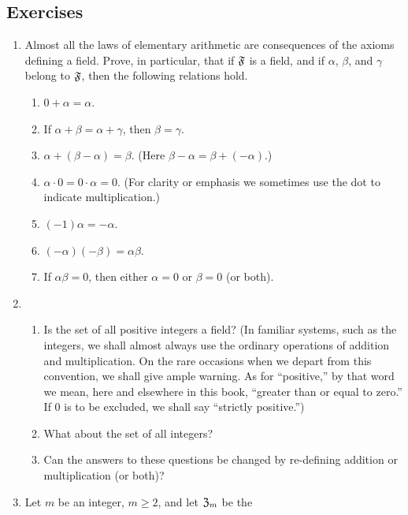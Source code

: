 {\small
\subsection*{Exercises}
\begin{enumerate}[wide]
    \item Almost all the laws of elementary arithmetic are consequences of the axioms defining a field. Prove, in particular, that if \(\mathfrak{F}\) is a field, and if \(\alpha\), \(\beta\), and \(\gamma\) belong to \(\mathfrak{F}\), then the following relations hold.
    \begin{enumerate}[label=(\alph*), wide, nosep]
        \item \(0 + \alpha = \alpha\).
        \item If \(\alpha + \beta = \alpha + \gamma\), then \(\beta = \gamma\).
        \item \(\alpha + (\beta - \alpha) = \beta\). (Here \(\beta - \alpha = \beta + (-\alpha)\).)
        \item \(\alpha \cdot 0 = 0 \cdot \alpha = 0\). (For clarity or emphasis we sometimes use the dot to indicate multiplication.)
        \item \((-1)\alpha = -\alpha\).
        \item \((-\alpha)(-\beta) = \alpha \beta\).
        \item If \(\alpha\beta = 0\), then either \(\alpha = 0\) or \(\beta =
        0\) (or both).
    \end{enumerate}
    \item \begin{enumerate}[label=(\alph*), wide, nosep]
        \item Is the set of all positive integers a field? (In familiar systems,
        such as the integers, we shall almost always use the ordinary operations
        of addition and multiplication. On the rare occasions when we depart
        from this convention, we shall give ample warning. As for ``positive,''
        by that word we mean, here and elsewhere in this book, ``greater than or
        equal to zero.'' If 0 is to be excluded, we shall say ``strictly
        positive.'')
        \item What about the set of all integers?
        \item Can the answers to these questions be changed by re-defining addition or multiplication (or both)?
    \end{enumerate}
    \item Let \(m\) be an integer, \(m \geq 2\), and let \(\mathfrak{Z}_m\) be the

\end{enumerate}}

